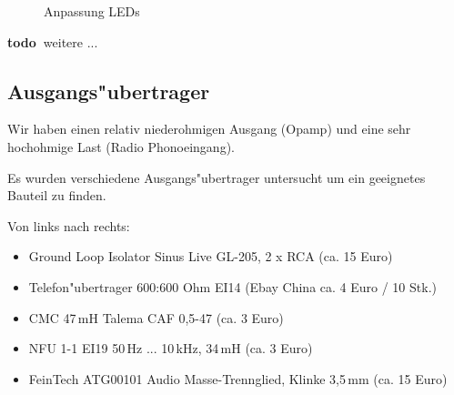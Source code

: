 \documentclass[ngerman,11pt,parskip=half] {scrartcl}
\newcommand {\todo} {\textbf{\color{red} todo\ }}
\begin{document}
\begin{figure}[H]
\centering
{}
\hspace{1cm} %
\caption{Anpassung LEDs} \label{fig:1}
\end{figure}



\todo weitere ...

\subsection{Ausgangs"ubertrager} \label{sec:untersuchung:ausgangsuebertrager}

Wir haben einen relativ niederohmigen Ausgang (Opamp) und eine sehr hochohmige Last (Radio Phonoeingang).

Es wurden verschiedene Ausgangs"ubertrager untersucht um ein geeignetes Bauteil zu finden. 

Von links nach rechts:
\begin{itemize}
\item Ground Loop Isolator Sinus Live GL-205, 2 x RCA (ca. 15 Euro)
\item Telefon"ubertrager 600:600 Ohm EI14 (Ebay China ca. 4 Euro / 10 Stk.)
\item CMC 47\,mH Talema CAF 0,5-47 (ca. 3 Euro)
\item NFU 1-1 EI19 50\,Hz ... 10\,kHz, 34\,mH (ca. 3 Euro)
\item FeinTech ATG00101 Audio Masse-Trennglied, Klinke 3,5\,mm (ca. 15 Euro)
\end{itemize}
\end{document}
